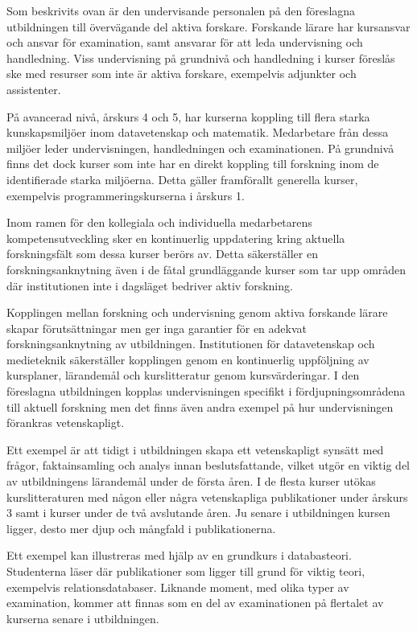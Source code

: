 Som beskrivits ovan är den undervisande personalen på den föreslagna utbildningen till övervägande del aktiva forskare. Forskande lärare har kursansvar och ansvar för examination, samt ansvarar för att leda undervisning och handledning. Viss undervisning på grundnivå och handledning i kurser föreslås ske med resurser som inte är aktiva forskare, exempelvis adjunkter och assistenter.

På avancerad nivå, årskurs 4 och 5, har kurserna koppling till flera starka kunskapsmiljöer inom datavetenskap och matematik. Medarbetare från dessa miljöer leder undervisningen, handledningen och examinationen. På grundnivå finns det dock kurser som inte har en direkt koppling till forskning inom de identifierade starka miljöerna. Detta gäller framförallt generella kurser, exempelvis programmeringskurserna i årskurs 1.

Inom ramen för den kollegiala och individuella medarbetarens kompetensutveckling sker en kontinuerlig uppdatering kring aktuella forskningsfält som dessa kurser berörs av. Detta säkerställer en forskningsanknytning även i de fåtal grundläggande kurser som tar upp områden där institutionen inte i dagsläget bedriver aktiv forskning.

Kopplingen mellan forskning och undervisning genom aktiva forskande lärare skapar förutsättningar men ger inga garantier för en adekvat forskningsanknytning av utbildningen. Institutionen för datavetenskap och medieteknik säkerställer kopplingen genom en kontinuerlig uppföljning av kursplaner, lärandemål och kurslitteratur genom kursvärderingar. I den föreslagna utbildningen kopplas undervisningen specifikt i fördjupningsområdena till aktuell forskning men det finns även andra exempel på hur undervisningen förankras vetenskapligt.

Ett exempel är att tidigt i utbildningen skapa ett vetenskapligt synsätt med frågor, faktainsamling och analys innan beslutsfattande, vilket utgör en viktig del av utbildningens lärandemål under de första åren. I de flesta kurser utökas kurslitteraturen med någon eller några vetenskapliga publikationer under årskurs 3 samt i kurser under de två avslutande åren. Ju senare i utbildningen kursen ligger, desto mer djup och mångfald i publikationerna.

Ett exempel kan illustreras med hjälp av en grundkurs i databasteori. Studenterna läser där publikationer som ligger till grund för viktig teori, exempelvis relationsdatabaser. Liknande moment, med olika typer av examination, kommer att finnas som en del av examinationen på flertalet av kurserna senare i utbildningen.

